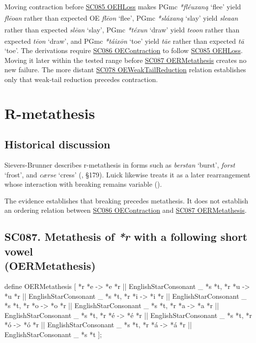 \documentclass[
  british,
  a4paper,
  openany]{book}
\providecommand{\Pred}[1]{\textsuperscript{\dag}\emph{#1}}
\providecommand{\Recon}[1]{\emph{*#1}}
{\catcode`→=\active \global\def→{\ensuremath{\rightarrow}}}
\providecommand{\texorpdfstring}[2]{#1}
\DeclareRobustCommand{\CAPRRuleHeading}[2]{%
  #1\texorpdfstring{\\(#2)}{ (#2)}%
}
\providecommand{\Pred}[1]{\textsuperscript{\dag}\emph{#1}}
\providecommand{\Recon}[1]{\emph{*#1}}
{\catcode`→=\active \global\def→{\ensuremath{\rightarrow}}}
\begin{document}
Moving contraction before \hyperref[rule-OEHLoss]{SC085 OEHLoss} makes
PGmc \Recon{fléuxaną} `flee' yield \Pred{flēoan} rather than expected OE
\emph{flēon} `flee', PGmc \Recon{sláxaną} `slay' yield \Pred{sleaan}
rather than expected \emph{slēan} `slay', PGmc \Recon{téxun} `draw'
yield \Pred{teoon} rather than expected \emph{tēon} `draw', and PGmc
\Recon{táixōn} `toe' yield \Pred{tāe} rather than expected \emph{tā}
`toe'. The derivations require \hyperref[rule-OEContraction]{SC086
OEContraction} to follow \hyperref[rule-OEHLoss]{SC085 OEHLoss}. Moving
it later within the tested range before
\hyperref[rule-OERMetathesis]{SC087 OERMetathesis} creates no new
failure. The more distant \hyperref[rule-OEWeakTailReduction]{SC078
OEWeakTailReduction} relation establishes only that weak-tail reduction
precedes contraction.

\newpage

\section{R-metathesis}\label{r-metathesis}

\subsection{Historical discussion}\label{historical-discussion-38}

Sievers-Brunner describes r-metathesis in forms such as \emph{berstan}
`burst', \emph{forst} `frost', and \emph{cærse} `cress'
(, §179). Luick
likewise treats it as a later rearrangement whose interaction with
breaking remains variable ().

The evidence establishes that breaking precedes metathesis. It does not
establish an ordering relation between
\hyperref[rule-OEContraction]{SC086 OEContraction} and
\hyperref[rule-OERMetathesis]{SC087 OERMetathesis}.

\subsection{\texorpdfstring{\CAPRRuleHeading{SC087. Metathesis of \emph{*r} with a following short vowel}{OERMetathesis}}{}}\label{rule-OERMetathesis}

\begin{ReaderFacingFoma}
define OERMetathesis [
    {*r} {*e} -> {*e} {*r} || EnglishStarConsonant _ {*s} {*t},
    {*r} {*u} -> {*u} {*r} || EnglishStarConsonant _ {*s} {*t},
    {*r} {*i} -> {*i} {*r} || EnglishStarConsonant _ {*s} {*t},
    {*r} {*o} -> {*o} {*r} || EnglishStarConsonant _ {*s} {*t},
    {*r} {*a} -> {*a} {*r} || EnglishStarConsonant _ {*s} {*t},
    {*r} {*é} -> {*é} {*r} || EnglishStarConsonant _ {*s} {*t},
    {*r} {*ó} -> {*ó} {*r} || EnglishStarConsonant _ {*s} {*t},
    {*r} {*á} -> {*á} {*r} || EnglishStarConsonant _ {*s} {*t}
];
\end{ReaderFacingFoma}
\end{document}
